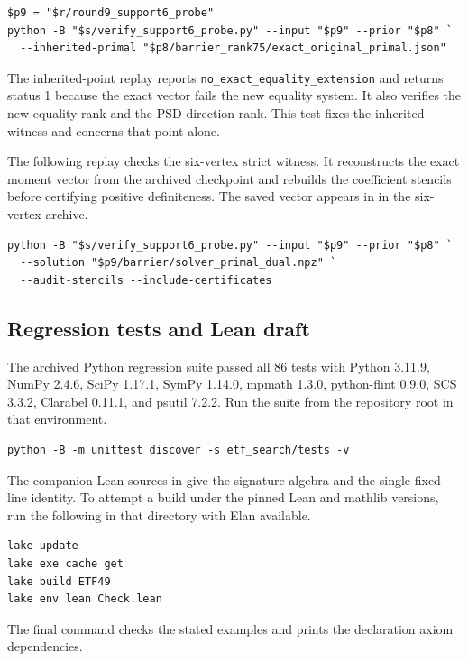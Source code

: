 \begin{verbatim}
$p9 = "$r/round9_support6_probe"
python -B "$s/verify_support6_probe.py" --input "$p9" --prior "$p8" `
  --inherited-primal "$p8/barrier_rank75/exact_original_primal.json"
\end{verbatim}

The inherited-point replay reports \texttt{no\_exact\_equality\_extension} and returns status 1 because the exact vector fails the new equality system. It also verifies the new equality rank and the PSD-direction rank. This test fixes the inherited witness and concerns that point alone.


The following replay checks the six-vertex strict witness. It reconstructs the exact moment vector from the archived checkpoint and rebuilds the coefficient stencils before certifying positive definiteness. The saved vector appears in  in the six-vertex archive.
\begin{verbatim}
python -B "$s/verify_support6_probe.py" --input "$p9" --prior "$p8" `
  --solution "$p9/barrier/solver_primal_dual.npz" `
  --audit-stencils --include-certificates
\end{verbatim}

\subsection{Regression tests and Lean draft}

The archived Python regression suite passed all 86 tests with Python 3.11.9, NumPy 2.4.6, SciPy 1.17.1, SymPy 1.14.0, mpmath 1.3.0, python-flint 0.9.0, SCS 3.3.2, Clarabel 0.11.1, and psutil 7.2.2. Run the suite from the repository root in that environment.
\begin{verbatim}
python -B -m unittest discover -s etf_search/tests -v
\end{verbatim}

The companion Lean sources in  give the signature algebra and the single-fixed-line identity. To attempt a build under the pinned Lean and mathlib versions, run the following in that directory with Elan available.
\begin{verbatim}
lake update
lake exe cache get
lake build ETF49
lake env lean Check.lean
\end{verbatim}
The final command checks the stated examples and prints the declaration axiom dependencies.
